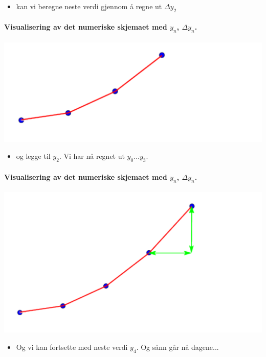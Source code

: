 \documentclass[%
oneside,                 %
final,                   %
10pt,norsk]{article}
\begin{document}
\begin{itemize}
\item kan vi beregne neste verdi gjennom å regne ut $\Delta y_2$
\end{itemize}

\noindent

\paragraph{Visualisering av det numeriske skjemaet med $y_n$, $\Delta y_n$.}
\centerline{\includegraphics[width=0.9\linewidth]{fig/diskret_funksjon_3.pdf}}



\begin{itemize}
\item og legge til $y_2$. Vi har nå regnet ut $y_0 \ldots y_3$.
\end{itemize}

\noindent

\paragraph{Visualisering av det numeriske skjemaet med $y_n$, $\Delta y_n$.}
\centerline{\includegraphics[width=0.9\linewidth]{fig/diskret_funksjon_5.pdf}}



\begin{itemize}
\item Og vi kan fortsette med neste verdi $y_4$. Og sånn går nå dagene...
\end{itemize}
\end{document}
